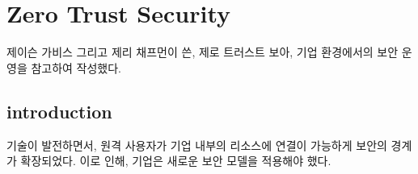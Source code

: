 \chapter{Zero Trust Security}

제이슨 가비스 그리고 제리 채프먼이 쓴, 제로 트러스트 보아, 기업 환경에서의 보안
운영을 참고하여 작성했다.

\section{introduction}

기술이 발전하면서, 원격 사용자가 기업 내부의 리소스에 연결이 가능하게 보안의 경계가 확장되었다.
이로 인해, 기업은 새로운 보안 모델을 적용해야 했다.